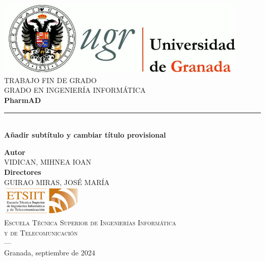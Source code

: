 \begin{titlepage}
 
 
\newlength{\centeroffset}
\setlength{\centeroffset}{-0.5\oddsidemargin}
\addtolength{\centeroffset}{0.5\evensidemargin}
\thispagestyle{empty}

\noindent\hspace*{\centeroffset}\begin{minipage}{\textwidth}

\centering
\includegraphics[width=0.9\textwidth]{imagenes/logo_ugr.jpg}\\[1.4cm]

\textsc{ \Large TRABAJO FIN DE GRADO\\[0.2cm]}
\textsc{ GRADO EN INGENIERÍA INFORMÁTICA}\\[1cm]
% 
{\Huge\bfseries PharmAD\\
}
\noindent\rule[-1ex]{\textwidth}{3pt}\\[3.5ex]
{\large\bfseries Añadir subtítulo y cambiar título provisional}
\end{minipage}

\vspace{2.5cm}
\noindent\hspace*{\centeroffset}\begin{minipage}{\textwidth}
\centering

\textbf{Autor}\\ {VIDICAN, MIHNEA IOAN}\\[2.5ex]
\textbf{Directores}\\
{GUIRAO MIRAS, JOSÉ MARÍA}\\[2cm]
\includegraphics[width=0.3\textwidth]{imagenes/etsiit_logo.png}\\[0.1cm]
\textsc{Escuela Técnica Superior de Ingenierías Informática \\ y de Telecomunicación}\\
\textsc{---}\\
Granada, septiembre de 2024
\end{minipage}
\end{titlepage}


